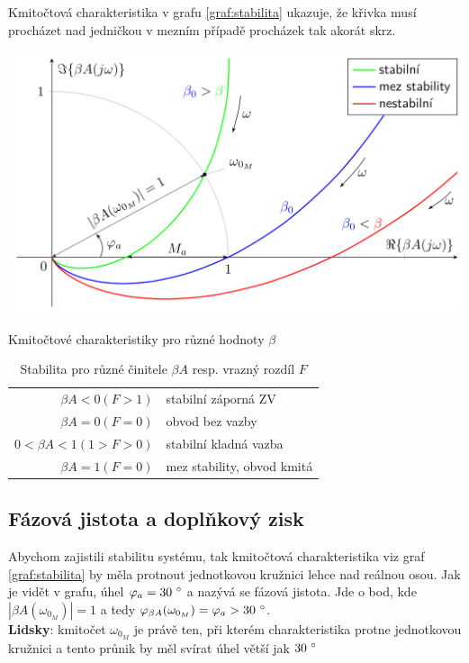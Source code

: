 \documentclass[a4paper,12pt]{article}   %
\begin{document}
Kmitočtová charakteristika v grafu \ref{graf:stabilita} ukazuje, že křivka musí procházet nad jedničkou v mezním případě procházek tak akorát skrz.
\begin{graf}
    \centering
    \includegraphics[width=.6\textwidth]{stabilita_vice.PNG}
    \caption{Kmitočtové charakteristiky pro různé hodnoty $\beta$}
    \label{graf:stabilita}
\end{graf}

\begin{table}
    \centering
    \begin{tabular}{rl}
        $\beta A < 0 (F>1)$ & stabilní záporná ZV\\
        $\beta A = 0 (F=0)$ & obvod bez vazby \\
        $0 < \beta A < 1(1>F>0)$&stabilní kladná vazba\\
        $\beta A = 1 (F=0)$ & mez stability, obvod kmitá\\
    \end{tabular}
    \caption{Stabilita pro různé činitele $\beta A$ resp. vrazný rozdíl $F$}
    \label{tab:stabilita}
\end{table}

\subsection*{Fázová jistota a doplňkový zisk}
Abychom zajistili stabilitu systému, tak kmitočtová charakteristika viz graf \ref{graf:stabilita} by měla protnout jednotkovou kružnici lehce nad reálnou osou. Jak je vidět v grafu, úhel $\varphi_a = 30~\degree$ a nazývá se fázová jistota. Jde o bod, kde $|\beta A(\omega_{0_M})| = 1$ a tedy $\varphi_{\beta A}(\omega_{0_M}) = \varphi_a > 30~\degree$. \\
\textbf{Lidsky}: kmitočet $\omega_{0_M}$ je právě ten, při kterém charakteristika protne jednotkovou kružnici a tento průnik by měl svírat úhel větší jak $30~\degree$
\end{document}
